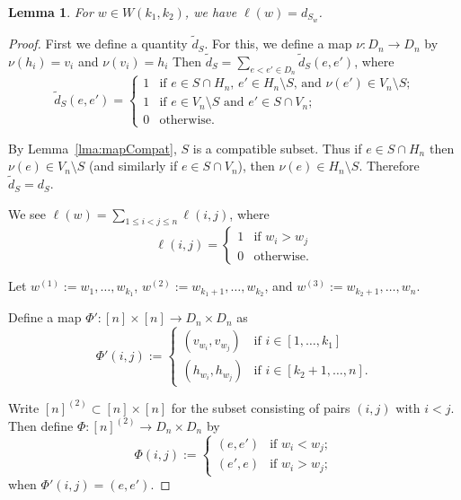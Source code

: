\documentclass{amsart}
\newtheorem{lma}{Lemma}
\newcommand{\bfn}{\mathbf{n}}
\begin{document}
  \begin{lma}
    \label{lma:lenMatch}
    For $w\in W(k_1,k_2)$, we have $\ell(w)=d_{S_w}$.
  \end{lma}
  \begin{proof}
    First we define a quantity $\widetilde{d}_S$. 
    For this, we define a map $\nu:D_n\to D_n$ by $\nu(h_i)=v_i$ and $\nu(v_i)=h_i$
    Then $\widetilde{d}_S=\sum\limits_{e<e'\in D_n} \widetilde{d}_S(e,e')$, where
    \[
      \widetilde{d}_S(e,e')=
      \begin{cases}
        1 & \text{if $e\in S\cap H_n$,  $e'\in H_n\setminus S$, and $\nu(e')\in V_n\setminus S$;}\\
        1 & \text{if $e\in V_n\setminus S$ and $e'\in S\cap V_n$;}\\
        0 & \text{otherwise.}
      \end{cases}
    \]

    By Lemma~\ref{lma:mapCompat}, $S$ is a compatible subset.
    Thus if $e\in S\cap H_n$ then $\nu(e)\in V_n\setminus S$ (and similarly if $e\in S\cap V_n$), then $\nu(e)\in H_n\setminus S$. 
    Therefore $\widetilde{d}_S=d_S$.

    We see $\ell(w)=\sum\limits_{1\leq i<j\leq n} \ell(i,j)$, where 
    \[
      \ell(i,j)=
      \begin{cases}
        1 & \text{if } w_i>w_j\\
        0 & \text{otherwise.}
      \end{cases}
    \]
 
    Let $w^{(1)}:=w_1,\ldots,w_{k_1}$, $w^{(2)}:=w_{k_1+1},\ldots,w_{k_2}$, and $w^{(3)}:=w_{k_2+1},\ldots,w_{n}$. 
 
    Define a map $\Phi':[n]\times [n]\rightarrow D_n\times D_n$ as
    \[
      \Phi'(i,j):=
      \begin{cases}
        (v_{w_i},v_{w_j}) & \text{if } i\in[1,\ldots,k_1]\\
        (h_{w_i},h_{w_j}) & \text{if } i\in[k_2+1,\ldots,n].
      \end{cases}
    \]

    Write $[n]^{(2)}\subset [n]\times[n]$ for the subset consisting of pairs $(i,j)$ with $i<j$.
    Then define $\Phi:[n]^{(2)}\to D_n\times D_n$ by
    \[
      \Phi(i,j):=
      \begin{cases}
        (e,e') & \text{if } w_i<w_j;\\
        (e',e) & \text{if } w_i>w_j;
      \end{cases}
    \]
    when $\Phi'(i,j)=(e,e')$. 
 

\end{proof}
\end{document}
